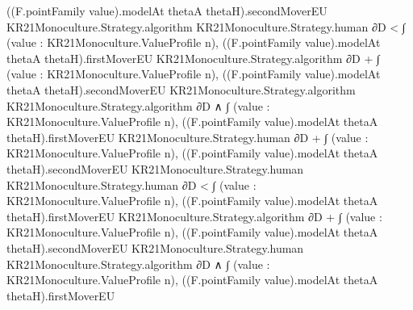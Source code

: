 \documentclass[10pt]{article}
\begin{document}
\begin{ReviewVerbatim}
                                                          ((F.pointFamily value).modelAt thetaA thetaH).secondMoverEU
                                                            KR21Monoculture.Strategy.algorithm
                                                            KR21Monoculture.Strategy.human ∂D <
                                                      ∫ (value : KR21Monoculture.ValueProfile n),
                                                          ((F.pointFamily value).modelAt thetaA thetaH).firstMoverEU
                                                            KR21Monoculture.Strategy.algorithm ∂D +
                                                        ∫ (value : KR21Monoculture.ValueProfile n),
                                                          ((F.pointFamily value).modelAt thetaA thetaH).secondMoverEU
                                                            KR21Monoculture.Strategy.algorithm
                                                            KR21Monoculture.Strategy.algorithm ∂D ∧
                                                    ∫ (value : KR21Monoculture.ValueProfile n),
                                                            ((F.pointFamily value).modelAt thetaA thetaH).firstMoverEU
                                                              KR21Monoculture.Strategy.human ∂D +
                                                          ∫ (value : KR21Monoculture.ValueProfile n),
                                                            ((F.pointFamily value).modelAt thetaA thetaH).secondMoverEU
                                                              KR21Monoculture.Strategy.human
                                                              KR21Monoculture.Strategy.human ∂D <
                                                        ∫ (value : KR21Monoculture.ValueProfile n),
                                                            ((F.pointFamily value).modelAt thetaA thetaH).firstMoverEU
                                                              KR21Monoculture.Strategy.algorithm ∂D +
                                                          ∫ (value : KR21Monoculture.ValueProfile n),
                                                            ((F.pointFamily value).modelAt thetaA thetaH).secondMoverEU
                                                              KR21Monoculture.Strategy.human
                                                              KR21Monoculture.Strategy.algorithm ∂D ∧
                                                      ∫ (value : KR21Monoculture.ValueProfile n),
                                                            ((F.pointFamily value).modelAt thetaA thetaH).firstMoverEU

\end{ReviewVerbatim}
\end{document}
